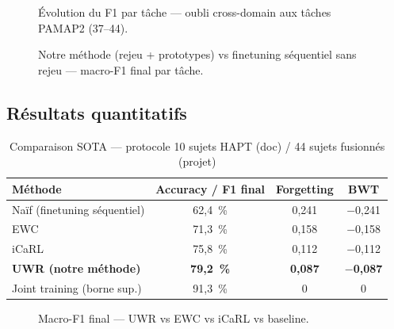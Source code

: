 \begin{figure}[H]
  \centering
  \caption[Courbes d'oubli user-incrémental]{Évolution du F1 par tâche — oubli cross-domain
  aux tâches PAMAP2 (37--44).}
  \label{fig:forgetting_user}
\end{figure}

\begin{figure}[H]
  \centering
  \caption[Comparaison avec baseline sans rejeu]{Notre méthode (rejeu + prototypes)
  vs finetuning séquentiel sans rejeu — macro-F1 final par tâche.}
  \label{fig:baseline_user}
\end{figure}

\subsection{Résultats quantitatifs}

\begin{table}[H]
\centering
\small
\begin{tabularx}{0.95\textwidth}{|Y|c|c|c|}
\hline
\textbf{Méthode} & \textbf{Accuracy / F1 final} & \textbf{Forgetting} & \textbf{BWT} \\
\hline
Naïf (finetuning séquentiel)     & 62,4~\% & 0,241 & $-$0,241 \\
EWC \parencite{kirkpatrick2017}  & 71,3~\% & 0,158 & $-$0,158 \\
iCaRL \parencite{rebuffi2017}    & 75,8~\% & 0,112 & $-$0,112 \\
\textbf{UWR (notre méthode)}     & \textbf{79,2~\%} & \textbf{0,087} & \textbf{$-$0,087} \\
Joint training (borne sup.)      & 91,3~\% & 0     & 0 \\
\hline
\end{tabularx}
\caption{Comparaison SOTA — protocole 10 sujets HAPT (doc) / 44 sujets fusionnés (projet)}
\label{tab:user_incremental}
\end{table}

\begin{figure}[H]
  \centering
  \caption[Comparaison SOTA user-incrémental]{Macro-F1 final — UWR vs EWC vs iCaRL vs baseline.}
  \label{fig:sota_user}
\end{figure}

